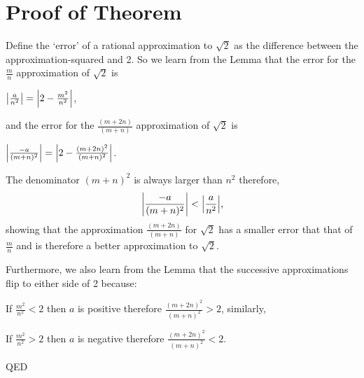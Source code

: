 \documentclass{article}
\DeclarePairedDelimiter\abs{\lvert}{\rvert}
\begin{document}
\section*{Proof of Theorem}
Define the `error' of a rational approximation to $\sqrt{2}$ as the difference between the
approximation-squared and 2.
So we learn from the Lemma that the error for the $\frac{m}{n}$ approximation of $\sqrt{2}$ is\newline
\centerline{$\abs*{\frac{a}{n^2}} = \abs*{2 - \frac{m^2}{n^2}}$,}

and the error for the $\frac{(m+2n)}{(m+n)}$ approximation of $\sqrt{2}$ is\newline
\centerline{$\abs*{\frac{-a}{(m+n)^2}} = \abs*{2 - \frac{(m+2n)^2}{(m+n)^2}}$.}

\bigskip
The denominator $(m+n)^2$ is always larger than $n^2$ therefore,
\[\abs*{\frac{-a}{(m+n)^2}} < \abs*{\frac{a}{n^2}} \text{,}\]
showing that the approximation $\frac{(m+2n)}{(m+n)}$ for
$\sqrt{2}$ 
has a smaller error that that of $\frac{m}{n}$ and is therefore
a better approximation to $\sqrt{2}$.

Furthermore, we also learn from the Lemma that the successive approximations flip
to either side of 2 because:

If $\frac{m^2}{n^2} < 2$ then $a$ is positive therefore $\frac{(m+2n)^2}{(m+n)^2} > 2$, similarly,

If $\frac{m^2}{n^2} > 2$ then $a$ is negative therefore $\frac{(m+2n)^2}{(m+n)^2} < 2$.

\bigskip
\hspace*{\fill}QED
\end{document}
